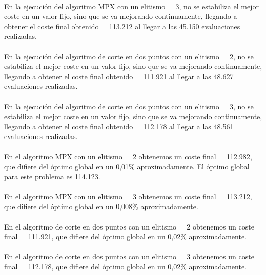 	\paragraph{}En la ejecución del algoritmo MPX con un elitismo = 3, no se estabiliza el mejor coste en un valor fijo, sino que se va mejorando continuamente, llegando a obtener el coste final obtenido = 113.212 al llegar a las 45.150 evaluaciones realizadas.
	
	\paragraph{}En la ejecución del algoritmo de corte en dos puntos con un elitismo = 2, no se estabiliza el mejor coste en un valor fijo, sino que se va mejorando continuamente, llegando a obtener el coste final obtenido = 111.921 al llegar a las 48.627 evaluaciones realizadas.
	
	\paragraph{}En la ejecución del algoritmo de corte en dos puntos con un elitismo = 3, no se estabiliza el mejor coste en un valor fijo, sino que se va mejorando continuamente, llegando a obtener el coste final obtenido = 112.178 al llegar a las 48.561 evaluaciones realizadas.
	
	\paragraph{}En el algoritmo MPX con un elitismo = 2 obtenemos un coste final = 112.982, que difiere del óptimo global en un 0,01\% aproximadamente. El óptimo global para este problema es 114.123.
	
	\paragraph{}En el algoritmo MPX con un elitismo = 3 obtenemos un coste final = 113.212, que difiere del óptimo global en un 0,008\% aproximadamente.
	
	\paragraph{}En el algoritmo de corte en dos puntos con un elitismo = 2 obtenemos un coste final = 111.921, que difiere del óptimo global en un 0,02\% aproximadamente.
	
	\paragraph{}En el algoritmo de corte en dos puntos con un elitismo = 3 obtenemos un coste final = 112.178, que difiere del óptimo global en un 0,02\% aproximadamente.
			
